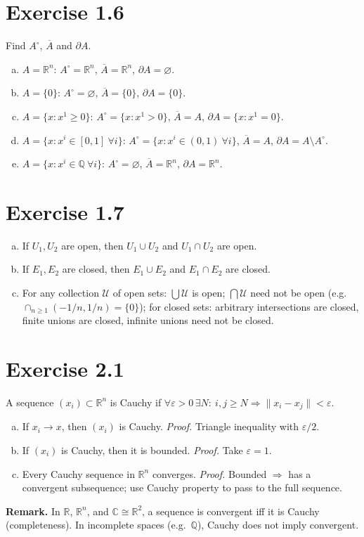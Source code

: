 \documentclass[11pt,a4paper]{article}
\begin{document}
\section*{Exercise 1.6}
Find $A^\circ$, $\overline{A}$ and $\partial A$.
\begin{enumerate}[a)]
\item $A=\mathbb{R}^n$: $A^\circ=\mathbb{R}^n$, $\overline{A}=\mathbb{R}^n$, $\partial A=\varnothing$.
\item $A=\{0\}$: $A^\circ=\varnothing$, $\overline{A}=\{0\}$, $\partial A=\{0\}$.
\item $A=\{x:x^1\ge 0\}$: $A^\circ=\{x:x^1>0\}$, $\overline{A}=A$, $\partial A=\{x:x^1=0\}$.
\item $A=\{x:x^i\in[0,1]\ \forall i\}$: $A^\circ=\{x:x^i\in(0,1)\ \forall i\}$, $\overline{A}=A$, $\partial A=A\setminus A^\circ$.
\item $A=\{x:x^i\in\mathbb{Q}\ \forall i\}$: $A^\circ=\varnothing$, $\overline{A}=\mathbb{R}^n$, $\partial A=\mathbb{R}^n$.
\end{enumerate}

\section*{Exercise 1.7}
\begin{enumerate}[a)]
\item If $U_1,U_2$ are open, then $U_1\cup U_2$ and $U_1\cap U_2$ are open.
\item If $E_1,E_2$ are closed, then $E_1\cup E_2$ and $E_1\cap E_2$ are closed.
\item For any collection $\mathcal U$ of open sets: $\bigcup\mathcal U$ is open; $\bigcap\mathcal U$ need not be open (e.g.\ $\cap_{n\ge1}(-1/n,1/n)=\{0\}$);
for closed sets: arbitrary intersections are closed, finite unions are closed, infinite unions need not be closed.
\end{enumerate}

\section*{Exercise 2.1}
A sequence $(x_i)\subset\mathbb{R}^n$ is Cauchy if $\forall\varepsilon>0\,\exists N:\ i,j\ge N\Rightarrow \|x_i-x_j\|<\varepsilon$.
\begin{enumerate}[a)]
\item If $x_i\to x$, then $(x_i)$ is Cauchy. \textit{Proof.} Triangle inequality with $\varepsilon/2$.
\item If $(x_i)$ is Cauchy, then it is bounded. \textit{Proof.} Take $\varepsilon=1$.
\item Every Cauchy sequence in $\mathbb{R}^n$ converges. \textit{Proof.} Bounded $\Rightarrow$ has a convergent subsequence; use Cauchy property to pass to the full sequence.
\end{enumerate}
\textbf{Remark.} In $\mathbb{R}$, $\mathbb{R}^n$, and $\mathbb{C}\cong\mathbb{R}^2$, a sequence is convergent iff it is Cauchy (completeness). In incomplete spaces (e.g.\ $\mathbb{Q}$), Cauchy does not imply convergent.
\end{document}
